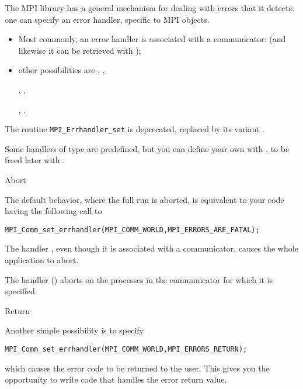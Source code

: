The MPI library has a general mechanism for dealing with errors that
it detects:
one can specify an error handler, specific to MPI objects.
\begin{itemize}
\item Most commonly, an error handler is associated with a communicator:
  (and likewise it can be retrieved with );
\item other possibilities are
  ,
  ,
\begin{mpifour}
  ,
  ,
\end{mpifour}
  ,
  .
\end{itemize}

\begin{remark}
  The routine
  \lstinline{MPI_Errhandler_set} is deprecated,
  replaced by its  variant  .
\end{remark}

Some handlers of type  are predefined,
but you can define your own with
,
to be freed later with
.

 {Abort}

The default behavior, where the full run is aborted, is
equivalent to your code having the following
call to 
\begin{lstlisting}
MPI_Comm_set_errhandler(MPI_COMM_WORLD,MPI_ERRORS_ARE_FATAL);
\end{lstlisting}

The handler , even though it is
associated with a communicator, causes the whole application to abort.

\begin{mpifour}
  The handler  ()
  aborts on the processes in the communicator for which it is specified.
\end{mpifour}

 {Return}

Another simple possibility is to specify
\begin{lstlisting}
MPI_Comm_set_errhandler(MPI_COMM_WORLD,MPI_ERRORS_RETURN);
\end{lstlisting}
which causes the error code to be returned to the user.
This gives you the opportunity to write code that handles the error
return value. 

